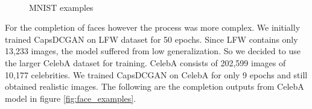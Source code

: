 \begin{figure}[H]
    \\
    \centering
    \caption{MNIST examples}%
    \label{fig:mnist_examples}%
\end{figure}

\newpage
For the completion of faces however the process was more complex. We initially trained CapsDCGAN on LFW dataset \cite{lfw} for 50 epochs. Since LFW contains only 13,233 images, the model suffered from low generalization. So we decided to use the larger CelebA dataset \cite{celeba} for training. CelebA consists of 202,599 images of 10,177 celebrities. We trained CapsDCGAN on CelebA for only 9 epochs and still obtained realistic images. The following are the completion outputs from CelebA model in figure \ref{fig:face_examples}.
